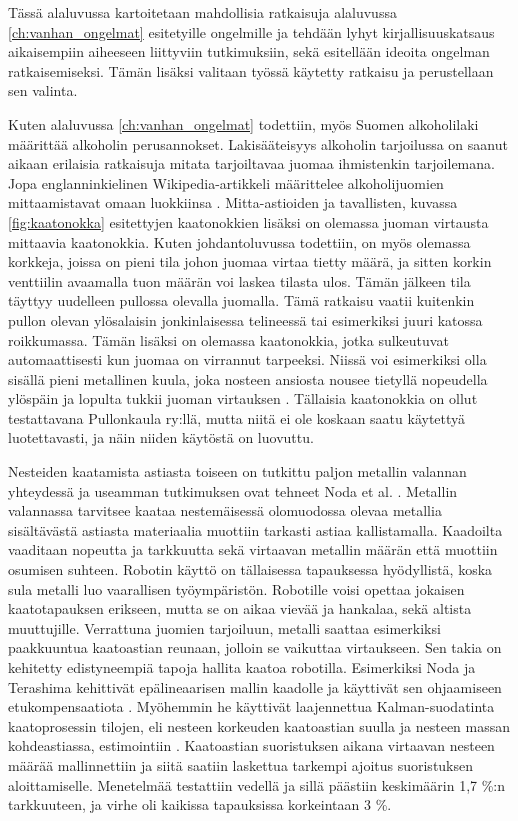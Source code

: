 Tässä alaluvussa kartoitetaan mahdollisia ratkaisuja alaluvussa \ref{ch:vanhan_ongelmat} esitetyille ongelmille ja tehdään lyhyt kirjallisuuskatsaus aikaisempiin aiheeseen liittyviin tutkimuksiin, sekä esitellään ideoita ongelman ratkaisemiseksi. Tämän lisäksi valitaan työssä käytetty ratkaisu ja perustellaan sen valinta.

Kuten alaluvussa \ref{ch:vanhan_ongelmat} todettiin, myös Suomen alkoholilaki määrittää alkoholin perusannokset. Lakisääteisyys alkoholin tarjoilussa on saanut aikaan erilaisia ratkaisuja mitata tarjoiltavaa juomaa ihmistenkin tarjoilemana. Jopa englanninkielinen Wikipedia-artikkeli määrittelee alkoholijuomien mittaamistavat omaan luokkiinsa \cite{Wikipedia}. Mitta-astioiden ja tavallisten, kuvassa \ref{fig:kaatonokka} esitettyjen kaatonokkien lisäksi on olemassa juoman virtausta mittaavia kaatonokkia. Kuten johdantoluvussa todettiin, on myös olemassa korkkeja, joissa on pieni tila johon juomaa virtaa tietty määrä, ja sitten korkin venttiilin avaamalla tuon määrän voi laskea tilasta ulos. Tämän jälkeen tila täyttyy uudelleen pullossa olevalla juomalla. Tämä ratkaisu vaatii kuitenkin pullon olevan ylösalaisin jonkinlaisessa telineessä tai esimerkiksi juuri katossa roikkumassa. Tämän lisäksi on olemassa kaatonokkia, jotka sulkeutuvat automaattisesti kun juomaa on virrannut tarpeeksi. Niissä voi esimerkiksi olla sisällä pieni metallinen kuula, joka nosteen ansiosta nousee tietyllä nopeudella ylöspäin ja lopulta tukkii juoman virtauksen \cite{Barproducts}. Tällaisia kaatonokkia on ollut testattavana Pullonkaula ry:llä, mutta niitä ei ole koskaan saatu käytettyä luotettavasti, ja näin niiden käytöstä on luovuttu.

Nesteiden kaatamista astiasta toiseen on tutkittu paljon metallin valannan yhteydessä ja useamman tutkimuksen ovat tehneet Noda et al. \cite{Noda2007,Noda2008,Noda2009}. Metallin valannassa tarvitsee kaataa nestemäisessä olomuodossa olevaa metallia sisältävästä astiasta materiaalia muottiin tarkasti astiaa kallistamalla. Kaadoilta vaaditaan nopeutta ja tarkkuutta sekä virtaavan metallin määrän että muottiin osumisen suhteen. Robotin käyttö on tällaisessa tapauksessa hyödyllistä, koska sula metalli luo vaarallisen työympäristön. Robotille voisi opettaa jokaisen kaatotapauksen erikseen, mutta se on aikaa vievää ja hankalaa, sekä altista muuttujille. Verrattuna juomien tarjoiluun, metalli saattaa esimerkiksi paakkuuntua kaatoastian reunaan, jolloin se vaikuttaa virtaukseen. Sen takia on kehitetty edistyneempiä tapoja hallita kaatoa robotilla. Esimerkiksi Noda ja Terashima kehittivät epälineaarisen mallin kaadolle ja käyttivät sen ohjaamiseen etukompensaatiota \cite{Noda2007}. Myöhemmin he käyttivät laajennettua Kalman-suodatinta kaatoprosessin tilojen, eli nesteen korkeuden kaatoastian suulla ja nesteen massan kohdeastiassa, estimointiin \cite{Noda2009}. Kaatoastian suoristuksen aikana virtaavan nesteen määrää mallinnettiin ja siitä saatiin laskettua tarkempi ajoitus suoristuksen aloittamiselle. Menetelmää testattiin vedellä ja sillä päästiin keskimäärin 1,7 \%:n tarkkuuteen, ja virhe oli kaikissa tapauksissa korkeintaan 3 \%.

